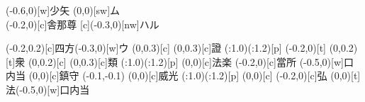 \documentclass[m_shidai]{subfiles}
\begin{document}
%
{\HUGE
\noindent
{}
{\qyu\moji(-0.6,0)[w]{少矢}%
\aki\tsuya{\s}}%
{\tsuya{\q}\tsu%
\aki\hiku{\s}\iro{\q}\lwoo}%
{\chikara{\s}\moji(0,0)[sw]{ム}\chi\矢[n]%
\yuriR{\c}\yuriR{\c}\irotome{\k}\osu{\k}\sho\kak\矢[s]\tsu}\\%
\hfill{}
\karifu(-0.2,0)[c]{舎那尊}{\chikara{\lw}\aki[0.5]{\q}%
\hiku{\s}\iro{\q}\lwoo{}[c]\sho\moji(-0.3,0)[nw]{ハル}%
\uchitsuke{\q}\tsuya{\q}}%

\karifu(-0.2,0.2)[c]{四方}{\chikara{\lw}\aki{\q}\tsuyamochi{\q}\moji(-0.3,0)[w]{ウ}\sho}
\karifu(0,0.3)[c]{}{\iro{\c}\chikara{\s}\tsuya{\q}\aki\tsuya{\q}\tsu}
\karifu(0,0.3)[c]{證}{\hiku{\s}\iro{\q}\lwoo%
\ooyu{\q}\kili[se]%
\base(\s:1.0)\modori*(\w:1.2)[p]\orisute\iro{\k}\sho\iro[2]{\k}\sho}%
\karifu(-0.2,0)[t]{}
{\uchitsuke{\q}\tsuya{\q}\aki\tsuya{\q}}
\newline
\karifu(0,0.2)[t]{衆}{\iro{\c}\chikara{\s}\tsuya{\q}}
\karifu(0,0.2)[c]{}{\tsuya{\q}}
\karifu(0,0.3)[c]{類}{\tsuya{\q}}
{\tsuya{\q}%
\ooyu{\q}\kili[se]\base(\s:1.0)\modori*(\w:1.2)[p]\orisute\iro{\k}\sho\iro[2]{\k}\sho}%
\karifu(0,0)[c]{法楽}
{\uchitsuke{\q}\tsuya{\q}
\aki\tsuya{\q}}
\newline
\karifu(-0.2,0)[c]{當所}
{\chikara{\lw}\tsuya{\q}
\aki\qyu\moji(-0.5,0)[w]{口内当}}
\karifu(0,0)[c]{鎮守}
{\qyu\moveTo(-0.1,-0.1)\iro{\c}\sho{}
\iro{\c}\sho\tsuya{\q}}
\karifu(0,0)[c]{威光}
  {\tsuya{\q}\ooyu{\q}\kili[e]
   \base(\s:1.0)\modori*(\w:1.2)[p]\orisute
   \iro{\k}\sho\iro[2]{\k}\sho}
\karifu(0,0)[c]{\hspace{-0.3zw}}{\chikara{\s}\tsuya{\q}\aki\tsuya{\q}}\newline
\karifu(-0.2,0)[c]{弘}{\chikara{\lw}\tsuya{\q}}
\karifu(0,0)[t]{法}{\qyu\moji(-0.5,0)[w]{口内当}}
}
\end{document}

